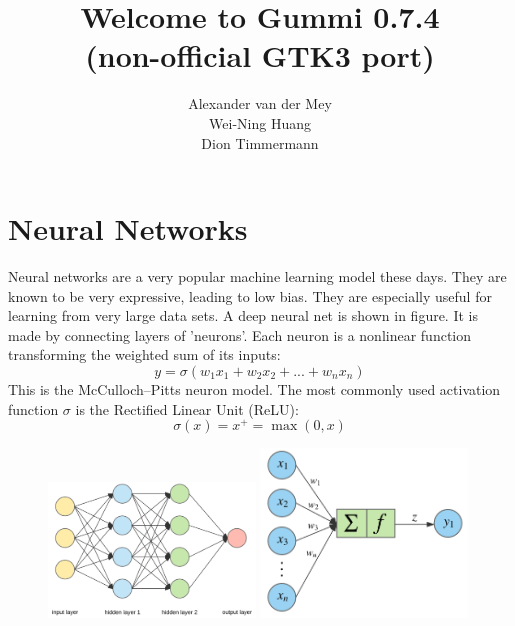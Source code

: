 \documentclass[11pt]{article}
\title{\textbf{Welcome to Gummi 0.7.4}\\ {\normalsize (non-official GTK3 port)}}
\author{Alexander van der Mey\\
		Wei-Ning Huang\\
		Dion Timmermann}
\date{}
\begin{document}
\maketitle

\section{Neural Networks}
Neural networks are a very popular machine learning model these days. They are known to be very expressive, leading to low bias. They are especially useful for learning from very large data sets. A deep neural net is shown in figure. It is made by connecting layers of 'neurons'. Each neuron is a nonlinear function transforming the weighted sum of its inputs:
\begin{equation*}
      y = \sigma(w_1x_1+w_2x_2+...+w_nx_n)
\end{equation*}
This is the McCulloch–Pitts neuron model. The most commonly used activation function $\sigma$ is the Rectified Linear Unit (ReLU):
\begin{equation*}
      \sigma(x) = x^+ = \max(0,x)
\end{equation*}

   \begin{figure}[b]
	\centering
	\includegraphics[width=0.49\textwidth]{network}
	\includegraphics[width=0.49\textwidth]{neuron}
	\end{figure}
\end{document}
